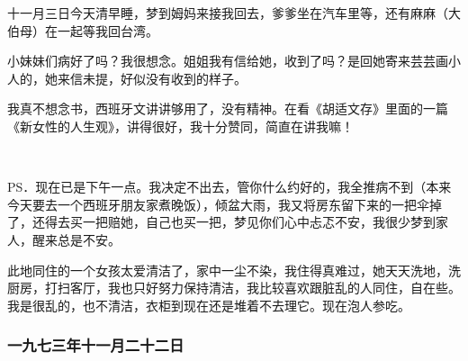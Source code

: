 \par 十一月三日今天清早睡，梦到姆妈来接我回去，爹爹坐在汽车里等，还有麻麻（大伯母）在一起等我回台湾。
\par 小妹妹们病好了吗？我很想念。姐姐我有信给她，收到了吗？是回她寄来芸芸画小人的，她来信未提，好似没有收到的样子。
\par 我真不想念书，西班牙文讲讲够用了，没有精神。在看《胡适文存》里面的一篇《新女性的人生观》，讲得很好，我十分赞同，简直在讲我嘛！
\par {}
\par  
\par PS．现在已是下午一点。我决定不出去，管你什么约好的，我全推病不到（本来今天要去一个西班牙朋友家煮晚饭），倾盆大雨，我又将房东留下来的一把伞掉了，还得去买一把赔她，自己也买一把，梦见你们心中忐忑不安，我很少梦到家人，醒来总是不安。
\par 此地同住的一个女孩太爱清洁了，家中一尘不染，我住得真难过，她天天洗地，洗厨房，打扫客厅，我也只好努力保持清洁，我比较喜欢跟脏乱的人同住，自在些。我是很乱的，也不清洁，衣柜到现在还是堆着不去理它。现在泡人参吃。


\subsubsection{一九七三年十一月二十二日}

